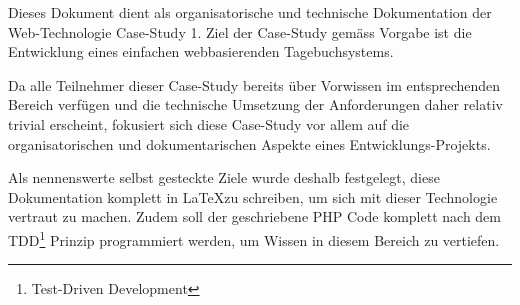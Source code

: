 \noindent
Dieses Dokument dient als organisatorische und technische Dokumentation der Web-Technologie Case-Study 1. Ziel der Case-Study gemäss Vorgabe ist die Entwicklung eines einfachen webbasierenden Tagebuchsystems.

Da alle Teilnehmer dieser Case-Study bereits über Vorwissen im entsprechenden Bereich verfügen und die technische Umsetzung der Anforderungen daher relativ trivial erscheint, fokusiert sich diese Case-Study vor allem auf die organisatorischen und dokumentarischen Aspekte eines Entwicklungs-Projekts.

Als nennenswerte selbst gesteckte Ziele wurde deshalb festgelegt, diese Dokumentation komplett in \LaTeX zu schreiben, um sich mit dieser Technologie vertraut zu machen. Zudem soll der geschriebene PHP Code komplett nach dem TDD\footnote{Test-Driven Development} Prinzip programmiert werden, um Wissen in diesem Bereich zu vertiefen.
